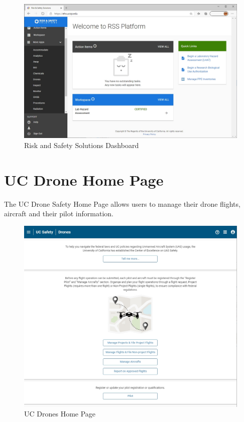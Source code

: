 \documentclass[
  12pt,
]{book}
\begin{document}
\begin{figure}

{\centering \includegraphics[width=0.85\linewidth]{images/RSS_apps} 

}

\caption{Risk and Safety Solutions Dashboard}\label{fig:rss-dash}
\end{figure}

\hypertarget{UCDrones-home}{%
\section{UC Drone Home Page}\label{UCDrones-home}}

The UC Drone Safety Home Page allows users to manage their drone flights, aircraft and their pilot information.

\begin{figure}

{\centering \includegraphics[width=0.85\linewidth]{images/UCDrones_Home} 

}

\caption{UC Drones Home Page}\label{fig:UCDrones-home}
\end{figure}
\end{document}
